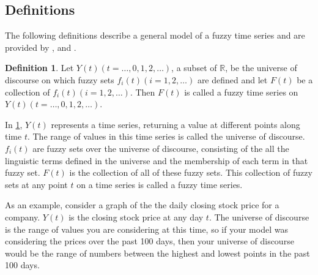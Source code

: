 \documentclass{article}
\theoremstyle{definition}
\newtheorem{ftsdef}{Definition}
\begin{document}

\subsection{Definitions}

The following definitions describe a general model of a fuzzy time series and are provided by \cite{song1993forecasting}, \cite{chen1996forecasting} and \cite{chu2009fuzzy}.

\begin{ftsdef}
\label{def1}
Let $Y(t)(t= \ldots,0,1,2, \ldots)$, a subset of $\mathbb{R}$, be the universe of discourse on which fuzzy sets $f_i(t)(i=1,2,\ldots)$ are defined and let $F(t)$ be a collection of $f_i(t)(i=1,2,\ldots)$. Then $F(t)$ is called a fuzzy time series on $Y(t)(t= \ldots,0,1,2, \ldots)$.
\end{ftsdef}
In \cref{def1}, $Y(t)$ represents a time series, returning a value at different points along time $t$. The range of values in this time series is called the universe of discourse. $f_i(t)$ are fuzzy sets over the universe of discourse, consisting of the all the linguistic terms defined in the universe and the membership of each term in that fuzzy set. $F(t)$ is the collection of all of these fuzzy sets. This collection of fuzzy sets at any point $t$ on a time series is called a fuzzy time series.

As an example, consider a graph of the the daily closing stock price for a company. $Y(t)$ is the closing stock price at any day $t$. The universe of discourse is the range of values you are considering at this time, so if your model was considering the prices over the past 100 days, then your universe of discourse would be the range of numbers between the highest and lowest points in the past 100 days. 
\end{document}
